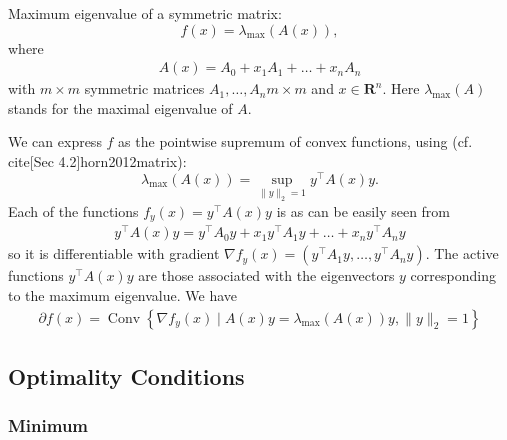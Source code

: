 \documentclass{article}
\begin{document}
\begin{exma}
Maximum eigenvalue of a symmetric matrix: $$f(x)=\lambda_{\max }(A(x)),$$ where
\begin{align*}
A(x)=A_{0}+x_{1} A_{1}+\ldots+x_{n} A_{n}
\end{align*}
with $m \times m$ symmetric matrices $A_{1}, \ldots, A_{n} m \times m$ and $x \in \mathbf{R}^{n} .$ Here $\lambda_{\max }(A)$ stands for the maximal eigenvalue of $A .$ 

We can express $f$ as the pointwise supremum of convex functions, using  (cf. cite[Sec 4.2]{horn2012matrix}):
$$\lambda_{\max }(A(x))=\sup _{\|y\|_2=1} y^{\top} A(x) y .$$
Each of the functions $f_{y}(x)=y^{\top} A(x) y$ is  as can be easily seen from
\begin{align*}
y^{\top} A(x) y=y^{\top} A_{0} y+x_{1} y^{\top} A_{1} y+\ldots+x_{n} y^{\top} A_{n} y
\end{align*}
so it is differentiable with gradient $\nabla f_{y}(x)=\left(y^{\top} A_{1} y, \ldots, y^{\top} A_{n} y\right)$.
The active functions $y^{\top} A(x) y$ are those associated with the eigenvectors $y$ corresponding to the maximum eigenvalue. We have
\begin{align*}
\partial f(x)=\operatorname{Conv}\left\{\nabla f_{y}(x)\mid A(x) y=\lambda_{\max}(A(x)) y,\| y \|_2=1\right\}
\end{align*}
\end{exma}
\subsection{Optimality Conditions}
\subsubsection{Minimum}
\end{document}
